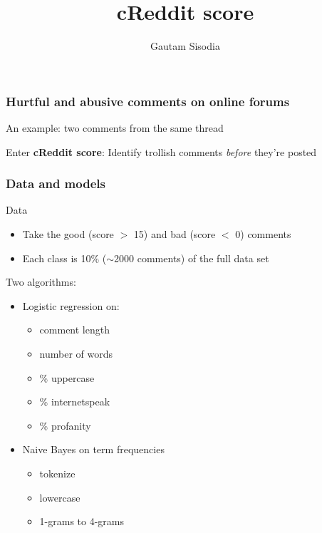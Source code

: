 \documentclass{beamer}
\title[cReddit score]{cReddit score}
\author[Sisodia]{Gautam Sisodia}
\begin{document}
\begin{frame}
\titlepage

\end{frame}


\begin{frame}
\frametitle{Hurtful and abusive comments on online forums}



\pause

\begin{figure}[h]
\end{figure}

\pause

An example: two comments from the same thread

\vspace{-0.4cm}
\begin{figure}[h]
\end{figure}

\pause

\vspace{-0.5cm}
\begin{figure}[h]
\end{figure}

\pause

Enter {\bf cReddit score}: Identify trollish comments {\it before} they're posted

\end{frame}

\begin{frame}
\frametitle{Data and models}

Data
\begin{itemize}
\item Take the good (score $>$ 15) and bad (score $<$ 0) comments
\pause
\item Each class is 10\% ($\sim$2000 comments) of the full data set 
\end{itemize}

Two algorithms:
\begin{itemize}
\item Logistic regression on:
\pause
\begin{itemize}
\item comment length
\pause
\item number of words
\pause
\item \% uppercase
\pause
\item \% internetspeak
\pause
\item \% profanity
\end{itemize}
\pause
\item Naive Bayes on term frequencies
\begin{itemize}
\pause
\item tokenize
\pause
\item lowercase
\pause
\item 1-grams to 4-grams
\end{itemize}
\end{itemize}

\end{frame}
\end{document}
